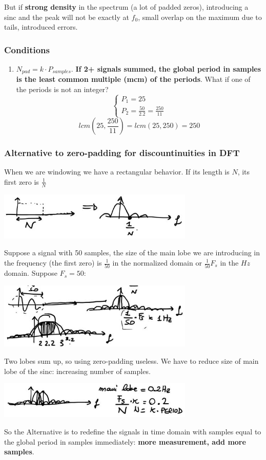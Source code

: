 But if \textbf{strong density} in the spectrum (a lot of padded zeros), introducing a sinc and the peak will not be exactly at $f_0$, small overlap on the maximum
due to tails, introduced errors.

\subsubsection{Conditions}
\begin{enumerate}
    \item $N_{pad}=k\cdot P_{samples}$. \textbf{If 2+ signals summed, the global period in samples is the least common multiple (mcm) of the periods}. What if one of the periods is not an integer?
    $$
    \begin{cases}
        P_1=25\\
        P_2=\frac{50}{2.2}=\frac{250}{11}
    \end{cases}
    $$
    $$
    lcm(25,\frac{250}{11})=lcm(25,250)=250
    $$
\end{enumerate}

\subsubsection{Alternative to zero-padding for discountinuities in DFT}
When we are windowing we have a rectangular behavior. If its length is $N$, its first zero is $\frac{1}{N}$
\begin{center}
    \includegraphics[width=0.7\textwidth]{images/zero_pad_04.png}
\end{center}
Suppose a signal with 50 samples, the size of the main lobe we are introducing in the frequency (the first zero) is $\frac{1}{50}$ in the normalized domain or $\frac{1}{50}F_s$ in the $Hz$ domain. Suppose $F_s=50$:
\begin{center}
    \includegraphics[width=0.7\textwidth]{images/zero_pad_05.png}
\end{center}
Two lobes sum up, so using zero-padding useless. We have to reduce size of main lobe of the sinc: increasing number of samples.
\begin{center}
    \includegraphics[width=0.7\textwidth]{images/zero_pad_06.png}
\end{center}
So the Alternative is to redefine the signals in time domain with samples equal to the global period in samples immediately: \textbf{more measurement, add more samples}.

